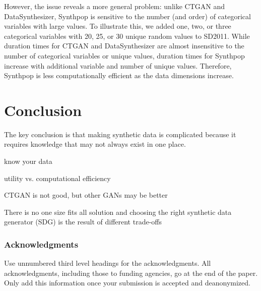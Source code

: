 \documentclass[runningheads]{llncs}
\begin{document}
However, the issue reveals a more general problem: unlike CTGAN and DataSynthesizer, Synthpop is sensitive to the number (and order) of categorical variables with large values.  To illustrate this, we added one, two, or three categorical variables with 20, 25, or 30 unique random values to SD2011.  While duration times for CTGAN and DataSynthesizer are almost insensitive to the number of categorical variables or unique values, duration times for Synthpop increase with additional variable and number of unique values.  Therefore, Synthpop is less computationally efficient as the data dimensions increase.


\section{Conclusion}\label{sec:conclusion}

The key conclusion is that making synthetic data is complicated because it requires knowledge that may not always exist in one place.  

know your data

utility vs. computational efficiency

CTGAN is not good, but other GANs may be better



There is no one size fits all solution and choosing the right synthetic data generator (SDG) is the result of different trade-offs



\subsubsection*{Acknowledgments}
Use unnumbered third level headings for the acknowledgments. All acknowledgments, including those to funding agencies, go at the end of the paper. Only add this information once your submission is accepted and deanonymized. 

\clearpage


\clearpage


\clearpage



\clearpage
\appendix

\end{document}
